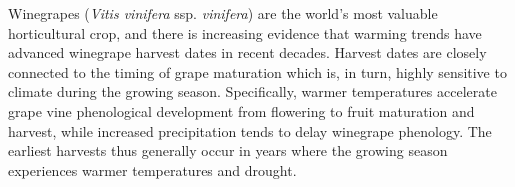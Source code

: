 \documentclass[final]{nature}
\begin{document}
\noindent Winegrapes (\emph{Vitis vinifera} ssp. \emph{vinifera}) are the world's most valuable horticultural crop, and there is increasing evidence that warming trends have advanced winegrape harvest dates in recent decades\cite{Duchene:2005bd,Jones:2000br,schultzjones,Seguin2005,tomasi2011,odo2012,webb2012}. Harvest dates are closely connected to the timing of grape maturation which is, in turn, highly sensitive to climate during the growing season. Specifically, warmer temperatures accelerate grape vine phenological development from flowering to fruit maturation and harvest, while increased precipitation tends to delay winegrape phenology\cite{jones2013}. The earliest harvests thus generally occur in years where the growing season experiences warmer temperatures and drought\cite{Jones:2000br}.\\
\end{document}
